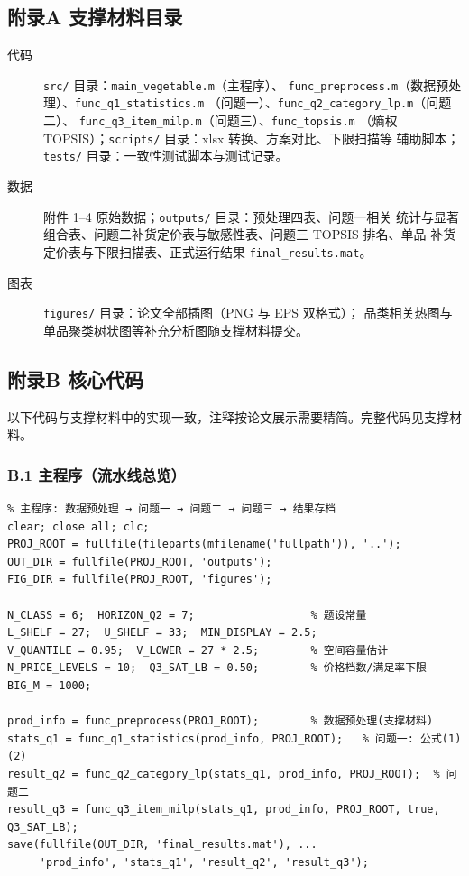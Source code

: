 
\subsection{附录A 支撑材料目录}

\begin{description}
\item[代码] \texttt{src/} 目录：\texttt{main\_vegetable.m}（主程序）、
      \texttt{func\_preprocess.m}（数据预处理）、\texttt{func\_q1\_statistics.m}
      （问题一）、\texttt{func\_q2\_category\_lp.m}（问题二）、
      \texttt{func\_q3\_item\_milp.m}（问题三）、\texttt{func\_topsis.m}
      （熵权 TOPSIS）；\texttt{scripts/} 目录：xlsx 转换、方案对比、下限扫描等
      辅助脚本；\texttt{tests/} 目录：一致性测试脚本与测试记录。
\item[数据] 附件 1--4 原始数据；\texttt{outputs/} 目录：预处理四表、问题一相关
      统计与显著组合表、问题二补货定价表与敏感性表、问题三 TOPSIS 排名、单品
      补货定价表与下限扫描表、正式运行结果 \texttt{final\_results.mat}。
\item[图表] \texttt{figures/} 目录：论文全部插图（PNG 与 EPS 双格式）；
      品类相关热图与单品聚类树状图等补充分析图随支撑材料提交。
\end{description}

\subsection{附录B 核心代码}

以下代码与支撑材料中的实现一致，注释按论文展示需要精简。完整代码见支撑材料。

\subsubsection{B.1 主程序（流水线总览）}

{\footnotesize
\begin{verbatim}
% 主程序: 数据预处理 → 问题一 → 问题二 → 问题三 → 结果存档
clear; close all; clc;
PROJ_ROOT = fullfile(fileparts(mfilename('fullpath')), '..');
OUT_DIR = fullfile(PROJ_ROOT, 'outputs');
FIG_DIR = fullfile(PROJ_ROOT, 'figures');

N_CLASS = 6;  HORIZON_Q2 = 7;                  % 题设常量
L_SHELF = 27;  U_SHELF = 33;  MIN_DISPLAY = 2.5;
V_QUANTILE = 0.95;  V_LOWER = 27 * 2.5;        % 空间容量估计
N_PRICE_LEVELS = 10;  Q3_SAT_LB = 0.50;        % 价格档数/满足率下限
BIG_M = 1000;

prod_info = func_preprocess(PROJ_ROOT);        % 数据预处理(支撑材料)
stats_q1 = func_q1_statistics(prod_info, PROJ_ROOT);   % 问题一: 公式(1)(2)
result_q2 = func_q2_category_lp(stats_q1, prod_info, PROJ_ROOT);  % 问题二
result_q3 = func_q3_item_milp(stats_q1, prod_info, PROJ_ROOT, true, Q3_SAT_LB);
save(fullfile(OUT_DIR, 'final_results.mat'), ...
     'prod_info', 'stats_q1', 'result_q2', 'result_q3');
\end{verbatim}
}

